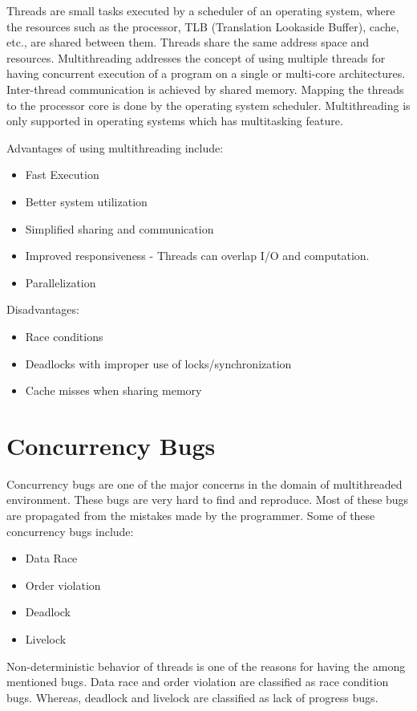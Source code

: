 Threads are small tasks executed by a scheduler of an operating system, where the resources such as the processor, TLB (Translation Lookaside Buffer), cache, etc., are shared between them. 
Threads share the same address space and resources. 
Multithreading addresses the concept of using multiple threads for having concurrent execution of a program on a single or multi-core architectures. 
Inter-thread communication is achieved by shared memory. 
Mapping the threads to the processor core is done by the operating system scheduler. 
Multithreading is only supported in operating systems which has multitasking feature. 

Advantages of using multithreading include: 
\begin{itemize}
\item	Fast Execution
\item	Better system utilization
\item	Simplified sharing  and communication
\item 	Improved responsiveness - Threads can overlap I/O and computation.
\item	Parallelization
\end{itemize}

Disadvantages:
\begin{itemize}
\item	Race conditions
\item	Deadlocks with improper use of locks/synchronization
\item	Cache misses when sharing memory
\end{itemize}

\section{Concurrency Bugs \label{con_bugs}}

Concurrency bugs are one of the major concerns in the domain of multithreaded environment. 
These bugs are very hard to find and reproduce. 
Most of these bugs are propagated from the mistakes made by the programmer\cite{lopez2017study}. 
Some of these concurrency bugs include:
\begin{itemize}
\item	Data Race
\item 	Order violation
\item	Deadlock
\item	Livelock
\end{itemize}

Non-deterministic behavior of threads is one of the reasons for having the among mentioned bugs. 
Data race and order violation are classified as race condition bugs. 
Whereas, deadlock and livelock are classified as lack of progress bugs. 

